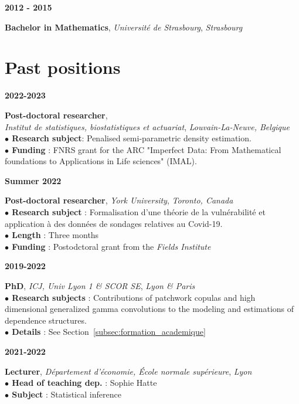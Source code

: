 \documentclass[a4paper,11pt]{article}
\newcommand{\tabcv}[2]{
\begin{minipage}[t]{0.12\linewidth}
\textbf{\footnotesize #1}
\end{minipage}\hfill
\begin{minipage}[t]{0.85\linewidth}
#2
\end{minipage}
\vspace{1em}
}
\begin{document}
\begin{flushleft}
\tabcv{2012 - 2015}{
\textbf{Bachelor in Mathematics}, \textit{Université de Strasbourg}, \textit{Strasbourg}\\[0.5em]
}

\clearpage
\section{Past positions}

\tabcv{2022-2023}{
\textbf{Post-doctoral researcher}, \\ \textit{Institut de statistiques, biostatistiques et actuariat}, \textit{Louvain-La-Neuve, Belgique}\\[0.5em]
{\footnotesize
\textbf{$\bullet$ Research subject}: Penalised semi-parametric density estimation.\\
\textbf{$\bullet$ Funding} : FNRS grant for the ARC "Imperfect Data:
From Mathematical foundations to Applications in Life sciences" (IMAL).\\
}
}


\tabcv{Summer 2022}{
\textbf{Post-doctoral researcher}, \textit{York University}, \textit{Toronto, Canada}\\[0.5em]
{\footnotesize
\textbf{$\bullet$ Research subject} : Formalisation d'une théorie de la vulnérabilité et application à des données de sondages relatives au Covid-19. \\
\textbf{$\bullet$ Length} : Three months\\
\textbf{$\bullet$ Funding} : Postodctoral grant from the \textit{Fields Institute}\\
}
}


\tabcv{2019-2022}{
\textbf{PhD}, \textit{ICJ, Univ Lyon 1 \& SCOR SE}, \textit{Lyon \& Paris}\\[0.5em]
{\footnotesize
\textbf{$\bullet$ Research subjects} : Contributions of patchwork copulas and high dimensional generalized gamma convolutions to the modeling and estimations of dependence structures. \\
\textbf{$\bullet$ Details} : See Section~\ref{subsec:formation_academique}\\
}
}

\tabcv{2021-2022}{
\textbf{Lecturer}, \textit{Département d'économie, École normale supérieure}, \textit{Lyon}\\[0.5em]
{\footnotesize
\textbf{$\bullet$ Head of teaching dep.} : Sophie Hatte\\
\textbf{$\bullet$ Subject} : Statistical inference\\
}
}


\end{flushleft}
\end{document}
